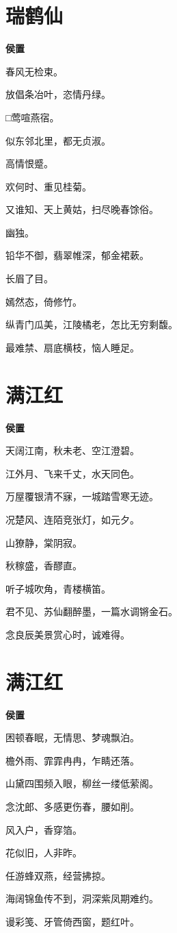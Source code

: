 \documentclass[12pt,a4paper]{ctexbook}
\begin{document}
\section{瑞鹤仙}
\textbf{侯置}\par\vspace{0.5em}
春风无检束。\par
放倡条冶叶，恣情丹绿。\par
□莺喧燕宿。\par
似东邻北里，都无贞淑。\par
高情恨蹙。\par
欢何时、重见桂菊。\par
又谁知、天上黄姑，扫尽晚春馀俗。\par
幽独。\par
铅华不御，翡翠帷深，郁金裙蔌。\par
长眉了目。\par
嫣然态，倚修竹。\par
纵青门瓜美，江陵橘老，怎比无穷剩馥。\par
最难禁、扇底横枝，恼人睡足。\par

\section{满江红}
\textbf{侯置}\par\vspace{0.5em}
天阔江南，秋未老、空江澄碧。\par
江外月、飞来千丈，水天同色。\par
万屋覆银清不寐，一城踏雪寒无迹。\par
况楚风、连陌竞张灯，如元夕。\par
山獠静，棠阴寂。\par
秋稼盛，香醪直。\par
听子城吹角，青楼横笛。\par
君不见、苏仙翻醉墨，一篇水调锵金石。\par
念良辰美景赏心时，诚难得。\par

\section{满江红}
\textbf{侯置}\par\vspace{0.5em}
困顿春眠，无情思、梦魂飘泊。\par
檐外雨、霏霏冉冉，乍睛还落。\par
山黛四围频入眼，柳丝一缕低萦阁。\par
念沈郎、多感更伤春，腰如削。\par
风入户，香穿箔。\par
花似旧，人非昨。\par
任游蜂双燕，经营拂掠。\par
海阔锦鱼传不到，洞深紫凤期难约。\par
谩彩笺、牙管倚西窗，题红叶。\par
\end{document}

